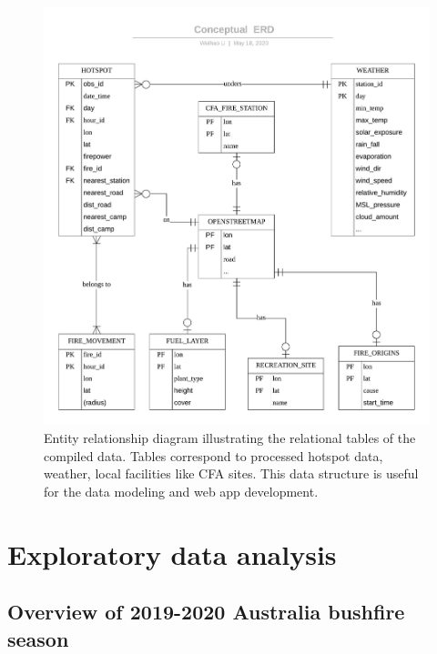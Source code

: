\documentclass{monashthesis}
\begin{document}
\begin{figure}
\centering
\includegraphics{figures/Shiny_app_data_Conceptual_ERD.jpeg}
\caption{Entity relationship diagram illustrating the relational tables
of the compiled data. Tables correspond to processed hotspot data,
weather, local facilities like CFA sites. This data structure is useful
for the data modeling and web app development. \label{fig:ERD}}
\end{figure}

\chapter{Exploratory data analysis}\label{exploratory-data-analysis}

\section{Overview of 2019-2020 Australia bushfire
season}\label{overview-of-2019-2020-australia-bushfire-season}
\end{document}
